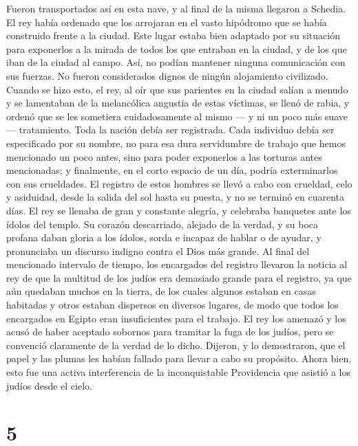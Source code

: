  Fueron transportados así en esta nave, y al final de la
misma llegaron a Schedia. El rey había ordenado que los arrojaran en el
vasto hipódromo que se había construido frente a la ciudad. Este lugar
estaba bien adaptado por su situación para exponerlos a la mirada de
todos los que entraban en la ciudad, y de los que iban de la ciudad al
campo. Así, no podían mantener ninguna comunicación con sus fuerzas. No
fueron considerados dignos de ningún alojamiento civilizado.
 Cuando se hizo esto, el rey, al oír que sus parientes en
la ciudad salían a menudo y se lamentaban de la melancólica angustia de
estas víctimas,  se llenó de rabia, y ordenó que se les
sometiera cuidadosamente al mismo --- y ni un poco más suave ---
tratamiento.  Toda la nación debía ser registrada. Cada
individuo debía ser especificado por su nombre, no para esa dura
servidumbre de trabajo que hemos mencionado un poco antes, sino para
poder exponerlos a las torturas antes mencionadas; y finalmente, en el
corto espacio de un día, podría exterminarlos con sus crueldades.
 El registro de estos hombres se llevó a cabo con
crueldad, celo y asiduidad, desde la salida del sol hasta su puesta, y
no se terminó en cuarenta días.  El rey se llenaba de
gran y constante alegría, y celebraba banquetes ante los ídolos del
templo. Su corazón descarriado, alejado de la verdad, y su boca profana
daban gloria a los ídolos, sorda e incapaz de hablar o de ayudar, y
pronunciaba un discurso indigno contra el Dios más grande.
 Al final del mencionado intervalo de tiempo, los
encargados del registro llevaron la noticia al rey de que la multitud de
los judíos era demasiado grande para el registro,  ya que
aún quedaban muchos en la tierra, de los cuales algunos estaban en casas
habitadas y otros estaban dispersos en diversos lugares, de modo que
todos los encargados en Egipto eran insuficientes para el trabajo.
 El rey los amenazó y los acusó de haber aceptado
sobornos para tramitar la fuga de los judíos, pero se convenció
claramente de la verdad de lo dicho.  Dijeron, y lo
demostraron, que el papel y las plumas les habían fallado para llevar a
cabo su propósito.  Ahora bien, esto fue una activa
interferencia de la inconquistable Providencia que asistió a los judíos
desde el cielo.

\hypertarget{section-4}{%
\section{5}\label{section-4}}

